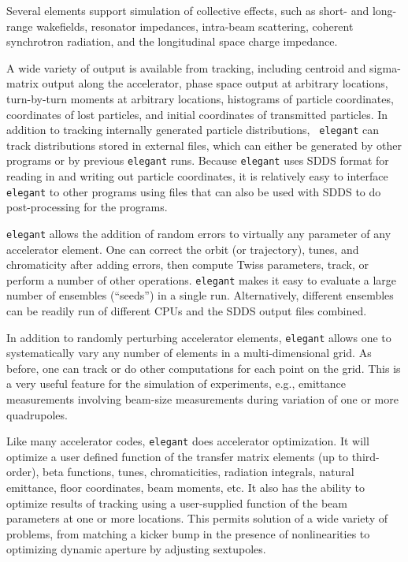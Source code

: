 \documentclass[11pt]{article}
\begin{document}
Several elements support simulation of collective effects, such as
short- and long-range wakefields, resonator impedances, intra-beam scattering,
coherent synchrotron radiation, and the longitudinal space charge
impedance. 

A wide variety of output is available from tracking, including
centroid and sigma-matrix output along the accelerator, phase space
output at arbitrary locations, turn-by-turn moments at arbitrary
locations, histograms of particle coordinates, coordinates of lost
particles, and initial coordinates of transmitted particles.  In
addition to tracking internally generated particle distributions, {\tt
elegant} can track distributions stored in external files, which can
either be generated by other programs or by previous {\tt elegant}
runs.  Because {\tt elegant} uses SDDS format for reading in and
writing out particle coordinates, it is relatively easy to interface
{\tt elegant} to other programs using files that can also be used with
SDDS to do post-processing for the programs.

{\tt elegant} allows the addition of random errors to virtually any
parameter of any accelerator element.  One can correct the orbit (or
trajectory), tunes, and chromaticity after adding errors, then compute
Twiss parameters, track, or perform a number of other operations.
{\tt elegant} makes it easy to evaluate a large number of ensembles (``seeds'')
in a single run.  Alternatively, different ensembles can be readily run
of different CPUs and the SDDS output files combined.

In addition to randomly perturbing accelerator elements, {\tt elegant}
allows one to systematically vary any number of elements in a
multi-dimensional grid.  As before, one can track or do other
computations for each point on the grid.  This is a very useful
feature for the simulation of experiments, e.g., emittance
measurements involving beam-size measurements during variation of one
or more quadrupoles\cite{Borland_PC}.

Like many accelerator codes, {\tt elegant} does accelerator
optimization.  It will optimize a user defined function of the
transfer matrix elements (up to third-order), beta functions, tunes,
chromaticities, radiation integrals, natural emittance, floor
coordinates, beam moments, etc.  It also has the ability to optimize results of
tracking using a user-supplied function of the beam parameters at one
or more locations.  This permits solution of a wide variety of
problems, from matching a kicker bump in the presence of
nonlinearities to optimizing dynamic aperture by adjusting sextupoles.
\end{document}

